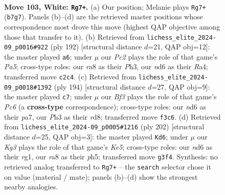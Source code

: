 \documentclass[11pt]{article}
\begin{document}
\clearpage

\begin{figure}[p]\centering
\begin{subfigure}{0.46\textwidth}\centering
\resizebox{\linewidth}{!}{%
\newchessgame
\chessboard[
  setfen={r7/PR6/3n2k1/6P1/8/5BKP/2P5/8 w - - 5 103},
  showmover=false,
  pgfstyle=straightmove, color=movearrow, markmove={b7-g7}
]}
\caption{}
\end{subfigure}\hfill
\begin{subfigure}{0.46\textwidth}\centering
\resizebox{\linewidth}{!}{%
\newchessgame
\chessboard[
  setfen={r7/8/8/PK3kP1/R4n1p/7P/8/8 w - - 2 97},
  showmover=false,
  pgfstyle=straightmove, color=movearrow, markmove={a5-a6}
]}
\caption{}
\end{subfigure}
\\[4pt]
\begin{subfigure}{0.46\textwidth}\centering
\resizebox{\linewidth}{!}{%
\newchessgame
\chessboard[
  setfen={3r4/p4k2/2P2P2/2K5/5R2/P7/8/8 w - - 5 98},
  showmover=false,
  pgfstyle=straightmove, color=movearrow, markmove={c6-c7}
]}
\caption{}
\end{subfigure}\hfill
\begin{subfigure}{0.46\textwidth}\centering
\resizebox{\linewidth}{!}{%
\newchessgame
\chessboard[
  setfen={3k4/1R4P1/8/4K2p/4B2P/8/8/6r1 w - - 1 102},
  showmover=false,
  pgfstyle=straightmove, color=movearrow, markmove={e5-d6}
]}
\caption{}
\end{subfigure}
\caption{\textbf{Move 103, White: \texttt{Rg7+}.} (a) Our position; Melanie plays \texttt{Rg7+} (\texttt{b7g7}). Panels (b)--(d) are the retrieved master positions whose correspondence most drove this move (highest QAP objective among those that transfer to it). (b) Retrieved from \texttt{lichess\_elite\_2024-09\_p0016\#922} (ply 192) [structural distance $d$=21, QAP obj=12]: the master played \texttt{a6}; under $\mu$ our \emph{Pc2} plays the role of that game's \emph{Pa5}; cross-type roles: our \emph{r}a8 as their \emph{P}h3, our \emph{n}d6 as their \emph{R}a4; transferred move \texttt{c2c4}. (c) Retrieved from \texttt{lichess\_elite\_2024-09\_p0018\#1392} (ply 194) [structural distance $d$=27, QAP obj=9]: the master played \texttt{c7}; under $\mu$ our \emph{Bf3} plays the role of that game's \emph{Pc6} (a \textbf{cross-type} correspondence); cross-type roles: our \emph{n}d6 as their \emph{p}a7, our \emph{P}h3 as their \emph{r}d8; transferred move \texttt{f3c6}. (d) Retrieved from \texttt{lichess\_elite\_2024-09\_p0005\#1216} (ply 202) [structural distance $d$=25, QAP obj=3]: the master played \texttt{Kd6}; under $\mu$ our \emph{Kg3} plays the role of that game's \emph{Ke5}; cross-type roles: our \emph{n}d6 as their \emph{r}g1, our \emph{r}a8 as their \emph{p}h5; transferred move \texttt{g3f4}. Synthesis: no retrieved analog transferred to \texttt{Rg7+} -- the \texttt{search} selector chose it on value (material / mate); panels (b)--(d) show the strongest nearby analogies.}
\label{fig:thought-m204}
\end{figure}
\end{document}
